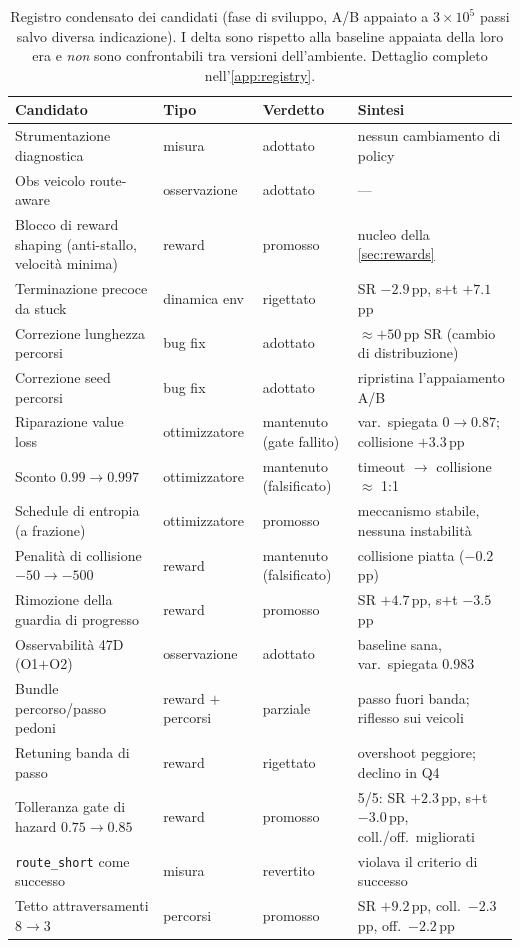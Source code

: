 \begin{table}[t]
  \centering\small
  \caption{Registro condensato dei candidati (fase di sviluppo, A/B
  appaiato a $3\times10^{5}$ passi salvo diversa indicazione). I delta
  sono rispetto alla baseline appaiata della loro era e \emph{non} sono
  confrontabili tra versioni dell'ambiente. Dettaglio completo
  nell'\cref{app:registry}.}
  \label{tab:candidates}
  \begin{tabular}{@{}p{4.2cm}p{2.6cm}p{2.2cm}p{3.6cm}@{}}
    \toprule
    Candidato & Tipo & Verdetto & Sintesi \\
    \midrule
    Strumentazione diagnostica & misura & adottato & nessun cambiamento di policy \\
    Obs veicolo route-aware & osservazione & adottato & --- \\
    Blocco di reward shaping (anti-stallo, velocità minima) & reward & promosso & nucleo della \cref{sec:rewards} \\
    Terminazione precoce da stuck & dinamica env & rigettato & SR $-2.9$\,pp, s$+$t $+7.1$\,pp \\
    Correzione lunghezza percorsi & bug fix & adottato & $\approx +50$\,pp SR (cambio di distribuzione) \\
    Correzione seed percorsi & bug fix & adottato & ripristina l'appaiamento A/B \\
    Riparazione value loss & ottimizzatore & mantenuto (gate fallito) & var.\ spiegata $0 \to 0.87$; collisione $+3.3$\,pp \\
    Sconto $0.99 \to 0.997$ & ottimizzatore & mantenuto (falsificato) & timeout $\to$ collisione $\approx$ 1:1 \\
    Schedule di entropia (a frazione) & ottimizzatore & promosso & meccanismo stabile, nessuna instabilità \\
    Penalità di collisione $-50 \to -500$ & reward & mantenuto (falsificato) & collisione piatta ($-0.2$\,pp) \\
    Rimozione della guardia di progresso & reward & promosso & SR $+4.7$\,pp, s$+$t $-3.5$\,pp \\
    Osservabilità 47D (O1$+$O2) & osservazione & adottato & baseline sana, var.\ spiegata 0.983 \\
    Bundle percorso/passo pedoni & reward $+$ percorsi & parziale & passo fuori banda; riflesso sui veicoli \\
    Retuning banda di passo & reward & rigettato & overshoot peggiore; declino in Q4 \\
    Tolleranza gate di hazard $0.75 \to 0.85$ & reward & promosso & 5/5: SR $+2.3$\,pp, s$+$t $-3.0$\,pp, coll./off.\ migliorati \\
    \texttt{route\_short} come successo & misura & revertito & violava il criterio di successo \\
    Tetto attraversamenti $8 \to 3$ & percorsi & promosso & SR $+9.2$\,pp, coll.\ $-2.3$\,pp, off.\ $-2.2$\,pp \\
    \bottomrule
  \end{tabular}
\end{table}

